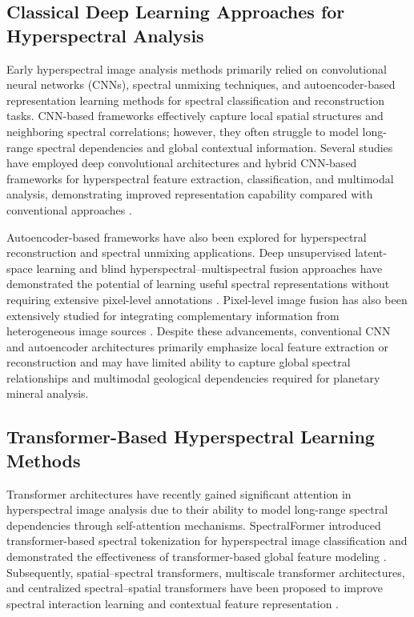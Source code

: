 \documentclass[pdflatex,sn-mathphys-num]{sn-jnl}
\begin{document}
\subsection{Classical Deep Learning Approaches for Hyperspectral Analysis}

Early hyperspectral image analysis methods primarily relied on convolutional neural networks (CNNs), spectral unmixing techniques, and autoencoder-based representation learning methods for spectral classification and reconstruction tasks. CNN-based frameworks effectively capture local spatial structures and neighboring spectral correlations; however, they often struggle to model long-range spectral dependencies and global contextual information. Several studies have employed deep convolutional architectures and hybrid CNN-based frameworks for hyperspectral feature extraction, classification, and multimodal analysis, demonstrating improved representation capability compared with conventional approaches \cite{ref5,ref7,ref10}.

Autoencoder-based frameworks have also been explored for hyperspectral reconstruction and spectral unmixing applications. Deep unsupervised latent-space learning and blind hyperspectral--multispectral fusion approaches have demonstrated the potential of learning useful spectral representations without requiring extensive pixel-level annotations \cite{ref15,ref22}. Pixel-level image fusion has also been extensively studied for integrating complementary information from heterogeneous image sources \cite{ref17}. Despite these advancements, conventional CNN and autoencoder architectures primarily emphasize local feature extraction or reconstruction and may have limited ability to capture global spectral relationships and multimodal geological dependencies required for planetary mineral analysis.


\subsection{Transformer-Based Hyperspectral Learning Methods}

Transformer architectures have recently gained significant attention in hyperspectral image analysis due to their ability to model long-range spectral dependencies through self-attention mechanisms. SpectralFormer introduced transformer-based spectral tokenization for hyperspectral image classification and demonstrated the effectiveness of transformer-based global feature modeling \cite{ref12}. Subsequently, spatial--spectral transformers, multiscale transformer architectures, and centralized spectral--spatial transformers have been proposed to improve spectral interaction learning and contextual feature representation \cite{ref9,ref4,ref16}.
\end{document}
